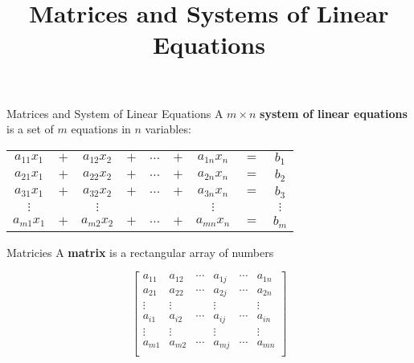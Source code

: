 \documentclass{beamer}
\title[MATH 1080 - Section 10.3]{Matrices and Systems of Linear Equations}
\begin{document}
\begin{frame}
  \titlepage
\end{frame}

\begin{frame}
\begin{block}{Matrices and System of Linear Equations}
A $m\times n$ \textbf{system of linear equations} is a set of $m$ equations in $n$ variables:

\vspace{-3mm}
\begin{center}
\begin{tabular}{ccccccccc}
$a_{11}x_1$&$+$&$a_{12}x_2$&$+$&$\dots$&$+$&$a_{1n}x_n$&$=$&$b_1$\\
$a_{21}x_1$&$+$&$a_{22}x_2$&$+$&$\dots$&$+$&$a_{2n}x_n$&$=$&$b_2$\\
$a_{31}x_1$&$+$&$a_{32}x_2$&$+$&$\dots$&$+$&$a_{3n}x_n$&$=$&$b_3$\\
$\vdots$&&$\vdots$&&&&$\vdots$&&$\vdots$\\
$a_{m1}x_1$&$+$&$a_{m2}x_2$&$+$&$\dots$&$+$&$a_{mn}x_n$&$=$&$b_m$\\
\end{tabular}
\end{center}
\end{block}\pause
\begin{block}{Matricies}
A \textbf{matrix} is a rectangular array of numbers

\vspace{-2mm}
\begin{equation*}
\begin{bmatrix}
a_{11} & a_{12} & \cdots & a_{1j} & \cdots & a_{1n} \\
a_{21} & a_{22} & \cdots & a_{2j} & \cdots & a_{2n} \\
\vdots & \vdots &        & \vdots &        & \vdots \\
a_{i1} & a_{i2} & \cdots & a_{ij} & \cdots & a_{in} \\
\vdots & \vdots &        & \vdots &        & \vdots \\
a_{m1} & a_{m2} & \cdots & a_{mj} & \cdots & a_{mn} \\
\end{bmatrix}
\end{equation*}
\end{block}
\end{frame}
\end{document}

